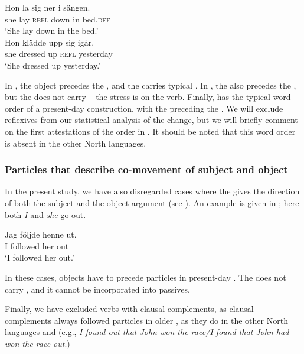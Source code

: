 \documentclass[output=paper]{langscibook}
\begin{document}
\ex\label{ex:lalu:19b}
\gll  Hon   la     sig ner     i   sängen.\\
    she     lay   \textsc{refl}   down   in   bed.\textsc{def}\\
  \glt `She lay down in the bed.’ \\
\ex\label{ex:lalu:19c}
\gll Hon   klädde   upp   sig   igår. \\
    she     dressed   up   \textsc{refl}   yesterday\\
\glt `She dressed up yesterday.’\\
\z
\z


In , the  object precedes the , and the  carries typical . In , the  also precedes the , but the  does not carry  – the stress is on the verb. Finally,  has the typical word order of a present-day   construction, with the  preceding the . We will exclude reflexives from our statistical analysis of the change, but we will briefly comment on the first attestations of the order in . It should be noted that this word order is absent in the other North  languages.



\subsubsection{Particles that describe co-movement of subject and object} 
In the present study, we have also disregarded cases where the  gives the direction of both the subject and the object argument (see \citealt{Toivonen2003}). An example is given in ; here both \textit{I} and \textit{she} go out.


\ea\label{ex:lalu:20}
\gll  Jag     följde     henne   ut.\\
I         followed   her     out\\
\glt `I followed her out.'
\z


In these cases, objects have to precede particles in present-day . The  does not carry , and it cannot be incorporated into passives.



Finally, we have excluded  verbs with clausal complements, as clausal complements always followed particles in older , as they do in the other North  languages and  (e.g., \textit{I found out that John won the race\slash\relax *I found that John had won the race out}.)
\end{document}
